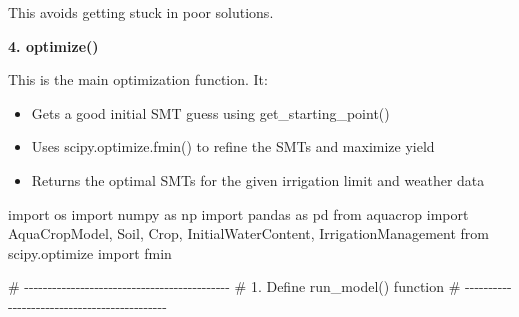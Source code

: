 \documentclass[
  letterpaper,
  DIV=11,
  numbers=noendperiod]{scrartcl}
\newenvironment{Shaded}{\begin{snugshade}}{\end{snugshade}}
\newcommand{\CommentTok}[1]{\textcolor[rgb]{0.37,0.37,0.37}{#1}}
\newcommand{\ImportTok}[1]{\textcolor[rgb]{0.00,0.46,0.62}{#1}}
\newcommand{\NormalTok}[1]{\textcolor[rgb]{0.00,0.23,0.31}{#1}}
\begin{document}
This avoids getting stuck in poor solutions.

\textbf{4. optimize()}

This is the main optimization function. It:

\begin{itemize}
\item
  Gets a good initial SMT guess using get\_starting\_point()
\item
  Uses scipy.optimize.fmin() to refine the SMTs and maximize yield
\item
  Returns the optimal SMTs for the given irrigation limit and weather
  data
\end{itemize}

\begin{Shaded}
\begin{Highlighting}[]
\ImportTok{import}\NormalTok{ os}
\ImportTok{import}\NormalTok{ numpy }\ImportTok{as}\NormalTok{ np}
\ImportTok{import}\NormalTok{ pandas }\ImportTok{as}\NormalTok{ pd}
\ImportTok{from}\NormalTok{ aquacrop }\ImportTok{import}\NormalTok{ AquaCropModel, Soil, Crop, InitialWaterContent, IrrigationManagement}
\ImportTok{from}\NormalTok{ scipy.optimize }\ImportTok{import}\NormalTok{ fmin}


\CommentTok{\# {-}{-}{-}{-}{-}{-}{-}{-}{-}{-}{-}{-}{-}{-}{-}{-}{-}{-}{-}{-}{-}{-}{-}{-}{-}{-}{-}{-}{-}{-}{-}{-}{-}{-}{-}{-}{-}{-}{-}{-}{-}{-}{-}{-}}
\CommentTok{\# 1. Define run\_model() function}
\CommentTok{\# {-}{-}{-}{-}{-}{-}{-}{-}{-}{-}{-}{-}{-}{-}{-}{-}{-}{-}{-}{-}{-}{-}{-}{-}{-}{-}{-}{-}{-}{-}{-}{-}{-}{-}{-}{-}{-}{-}{-}{-}{-}{-}{-}{-}}


\end{Highlighting}
\end{Shaded}
\end{document}
